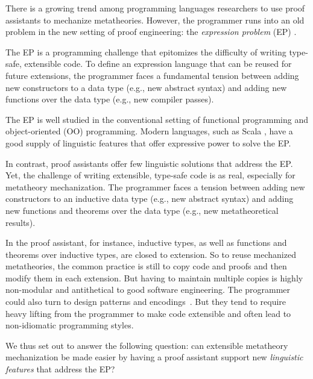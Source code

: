 
There is a growing trend among programming languages researchers
to use proof assistants to mechanize meta\-theories.
%
However, the programmer runs into an old problem
in the new setting of proof engineering:
the \emph{expression problem} (EP) \cite{wadler-ep}.

The EP is a programming challenge that
epitomizes the difficulty of writing type-safe, extensible code.
To define an expression language that can be reused for future extensions,
the programmer faces a fundamental tension \cite{reynolds1975} between
adding new constructors to a data type (e.g., new abstract syntax) and
adding new functions over the data type (e.g., new compiler passes).

The EP is well studied in the conventional setting of functional
programming and object-oriented (OO) programming.
Modern languages, such as Scala \cite{scala-oopsla05}, have a good
supply of linguistic features that offer expressive power to solve the
EP.

In contrast, proof assistants offer few linguistic solutions that
address the EP.
Yet, the challenge of writing extensible, type-safe code is
as real, especially for metatheory mechanization.
The programmer faces a tension between adding new constructors to an inductive data type
(e.g., new abstract syntax) and adding new functions and theorems over
the data type (e.g., new meta\-theoretical results).

In the \citeauthor{coq} proof assistant, for instance, inductive types, as well as functions and
theorems over inductive types, are closed to extension.
So to reuse mechanized metatheories,
the common practice is still to copy code and proofs and then modify them in each extension.
But having to maintain multiple copies is highly non-modular and
antithetical to good software engineering.
%
The programmer could also turn to design patterns and encodings~\cite{delaware2011,delaware2013,schwaab2013modular,keuchel2013generic,forsta2020}.
But they tend to require heavy lifting from the programmer to make code
extensible and often lead to non-idiomatic programming styles.

We thus set out to answer the following question:
can extensible metatheory mechanization be made easier by
having a proof assistant support new \emph{linguistic features} that address the EP?

